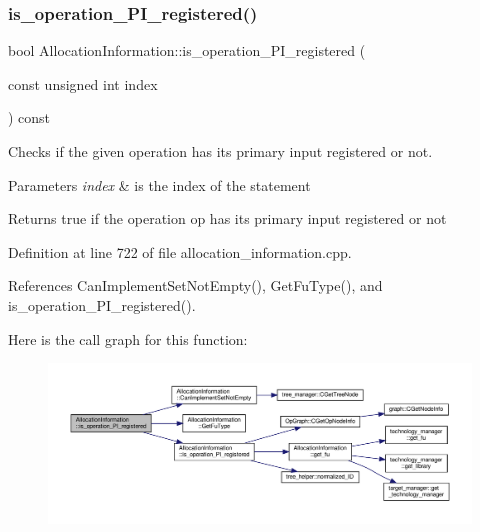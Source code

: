 \subsubsection{\texorpdfstring{is\+\_\+operation\+\_\+\+P\+I\+\_\+registered()}{is\_operation\_PI\_registered()}\hspace{0.1cm}{\footnotesize\ttfamily [3/3]}}
{\footnotesize\ttfamily bool Allocation\+Information\+::is\+\_\+operation\+\_\+\+P\+I\+\_\+registered (\begin{DoxyParamCaption}\item[{const unsigned int}]{index }\end{DoxyParamCaption}) const}



Checks if the given operation has its primary input registered or not. 


\begin{DoxyParams}{Parameters}
{\em index} & is the index of the statement \\
\hline
\end{DoxyParams}
\begin{DoxyReturn}{Returns}
true if the operation op has its primary input registered or not 
\end{DoxyReturn}


Definition at line 722 of file allocation\+\_\+information.\+cpp.



References Can\+Implement\+Set\+Not\+Empty(), Get\+Fu\+Type(), and is\+\_\+operation\+\_\+\+P\+I\+\_\+registered().

Here is the call graph for this function\+:
\nopagebreak
\begin{figure}[H]
\begin{center}
\leavevmode
\includegraphics[width=350pt]{d7/d79/classAllocationInformation_a5b773433e8ccb2c3517df0b7cec41f26_cgraph}
\end{center}
\end{figure}
\mbox{\label{classAllocationInformation_ae1bd5d0f2008ba69461691144bbdc07f}} 
